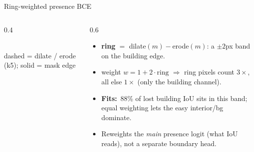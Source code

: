 \documentclass[aspectratio=169,11pt]{beamer}
\newcommand{\fit}{\textcolor{cHead}{\textbf{Fits:}}\ }
\begin{document}
\begin{frame}{Ring-weighted presence BCE}
  \begin{columns}[T]
    \begin{column}{0.4\textwidth}
      \centering
      \\[2pt]
      {\scriptsize dashed = dilate / erode (k5); solid = mask edge}
    \end{column}
    \begin{column}{0.6\textwidth}
      \begin{itemize}
        \item \textbf{ring} $=$ dilate$(m)-$erode$(m)$: a $\pm2$px band on the
          building edge.
        \item weight $w = 1 + 2\cdot\text{ring}$ $\Rightarrow$ ring pixels count
          $3\times$, all else $1\times$ (only the building channel).
        \item \fit 88\% of lost building IoU sits in this band; equal weighting
          lets the easy interior/bg dominate.
        \item Reweights the \emph{main} presence logit (what IoU reads), not a
          separate boundary head.
      \end{itemize}
    \end{column}
  \end{columns}
\end{frame}
\end{document}
